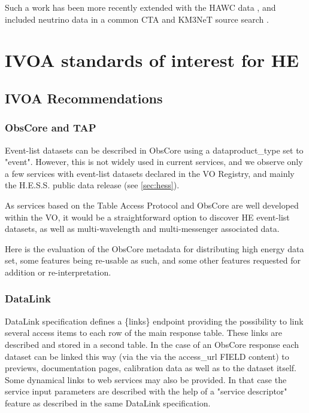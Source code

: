 \documentclass[11pt,a4paper]{ivoa}
\begin{document}
Such a work has been more recently extended with the HAWC data \citep{2022A&A...667A..36A}, and included neutrino data in a common CTA and KM3NeT source search \citep{unbehaun2023prospects}.


\section{IVOA standards of interest for HE}

\subsection{IVOA Recommendations}

\subsubsection{ObsCore and TAP}

Event-list datasets can be described in ObsCore using a dataproduct\_type set to "event". However, this is not widely used in current services, and we observe only a few services with event-list datasets declared in the VO Registry, and mainly the H.E.S.S. public data release (see \ref{sec:hess}).

As services based on the Table Access Protocol \citep{2019ivoa.spec.0927D} and ObsCore are well developed within the VO, it would be a straightforward option to discover HE event-list datasets, as well as multi-wavelength and multi-messenger associated data.

Here is the evaluation of the ObsCore metadata for distributing high energy data set, some features being re-usable as such, and some other features requested for addition or re-interpretation.


\subsubsection{DataLink}


DataLink specification \citep{2023ivoa.spec.1215B} defines a \{links\} endpoint providing the possibility to link several
access items to each row of the main response table. These links are described and stored in a second
table. In the case of an ObsCore response each dataset can be linked this way (via the via the access\_url
FIELD content) to previews, documentation pages, calibration data as well as to the dataset itself.
Some dynamical links to web services may also be provided. In that case the service input parameters are
described with the help of a "service descriptor" feature as described in the same DataLink specification.
\end{document}
